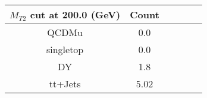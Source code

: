 \documentclass[8pt]{article}
\begin{document}
\begin{tabular}{|c|c|c|c|c|c|}
\hline
$M_{T2}$ cut at 200.0 (GeV) & Count \\
\hline
\hline
QCDMu & 0.0\\
singletop & 0.0\\
DY & 1.8\\
tt+Jets & 5.02\\
\hline
\hline
\end{tabular}
\end{document}
